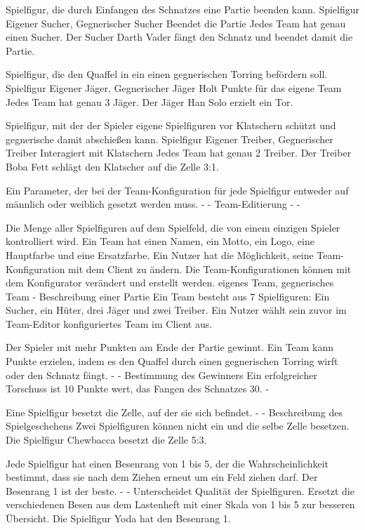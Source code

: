 {Spielfigur, die durch Einfangen des Schnatzes eine Partie beenden kann.}
{Spielfigur}
{Eigener Sucher, Gegnerischer Sucher}
{Beendet die Partie}
{Jedes Team hat genau einen Sucher.}
{Der Sucher \glqq{}Darth Vader\grqq{} fängt den Schnatz und beendet damit die Partie.}

{Spielfigur, die den Quaffel in ein einen gegnerischen Torring befördern soll.}
{Spielfigur}
{Eigener Jäger, Gegnerischer Jäger}
{Holt Punkte für das eigene Team}
{Jedes Team hat genau 3 Jäger.}
{Der Jäger \glqq{}Han Solo\grqq{} erzielt ein Tor.}

{Spielfigur, mit der der Spieler eigene Spielfiguren vor Klatschern schützt und gegnerische damit abschießen kann.}
{Spielfigur}
{Eigener Treiber, Gegnerischer Treiber}
{Interagiert mit Klatschern}
{Jedes Team hat genau 2 Treiber.}
{Der Treiber \glqq{}Boba Fett\grqq{} schlägt den Klatscher auf die Zelle 3:1.}

{Ein Parameter, der bei der Team-Konfiguration für jede Spielfigur entweder auf \glqq{}männlich\grqq{} oder \glqq{}weiblich\grqq{} gesetzt werden muss.}
{-}
{-}
{Team-Editierung}
{-}
{-}

{Die Menge aller Spielfiguren auf dem Spielfeld, die von einem einzigen Spieler kontrolliert wird. Ein Team hat einen Namen, ein Motto, ein Logo, eine Hauptfarbe und eine Ersatzfarbe. Ein Nutzer hat die Möglichkeit, seine Team-Konfiguration mit dem Client zu ändern. Die Team-Konfigurationen können mit dem Konfigurator verändert und erstellt werden.}
{eigenes Team, gegnerisches Team}
{-}
{Beschreibung einer Partie}
{Ein Team besteht aus 7 Spielfiguren: Ein Sucher, ein Hüter, drei Jäger und zwei Treiber.}
{Ein Nutzer wählt sein zuvor im Team-Editor konfiguriertes Team im Client aus.}

{Der Spieler mit mehr Punkten am Ende der Partie gewinnt. Ein Team kann Punkte erzielen, indem es den Quaffel durch einen gegnerischen Torring wirft oder den Schnatz fängt.}
{-}
{-}
{Bestimmung des Gewinners}
{Ein erfolgreicher Torschuss ist 10 Punkte wert, das Fangen des Schnatzes 30.}
{-}

{Eine Spielfigur besetzt die Zelle, auf der sie sich befindet.}
{-}
{-}
{Beschreibung des Spielgeschehens}
{Zwei Spielfiguren können nicht ein und die selbe Zelle besetzen.}
{Die Spielfigur \glqq{}Chewbacca\grqq{} besetzt die Zelle 5:3.}

{Jede Spielfigur hat einen Besenrang von 1 bis 5, der die Wahrscheinlichkeit bestimmt, dass sie nach dem Ziehen erneut um ein Feld ziehen darf. Der Besenrang 1 ist der beste.}
{-}
{-}
{Unterscheidet Qualität der Spielfiguren.}
{Ersetzt die verschiedenen \glqq{}Besen\grqq{} aus dem Lastenheft mit einer Skala von 1 bis 5 zur besseren Übersicht.}
{Die Spielfigur \glqq{}Yoda\grqq{} hat den Besenrang 1.}

